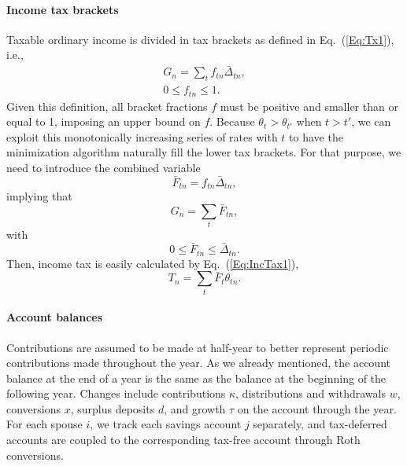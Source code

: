\documentclass{report}[fleqn,12pt]
\begin{document}
\paragraph*{Income tax brackets}
	Taxable ordinary income is divided in tax brackets as defined in Eq.~(\ref{Eq:Tx1}), i.e.,
	\begin{eqnarray}
		\label{Eq:C2}
		G_n = \sum_t f_{tn}\bar{\Delta}_{tn} ,\nonumber\\
		0 \leq f_{tn} \leq 1.
	\end{eqnarray}
	Given this definition, all bracket fractions $f$ must be positive and smaller than or equal to 1,
	imposing an upper bound on $f$.
	Because $\theta_{t} > \theta_{t'}$ when $t > t'$, we can exploit
	this monotonically increasing series of rates with $t$ to have the minimization
	algorithm naturally fill the lower tax brackets.
	For that purpose, we need to introduce the combined variable
	\begin{equation}
		\bar{F}_{tn} = f_{tn}\bar{\Delta}_{tn},
	\end{equation}
	implying that
	\begin{equation}
		G_n = \sum_t \bar{F}_{tn},
	\end{equation}
	with
	\begin{equation}
		0 \le \bar{F}_{tn} \le \bar{\Delta}_{tn}.
	\end{equation}
	Then, income tax is easily calculated by Eq.~(\ref{Eq:IncTax1}), 
	\begin{equation*}
		T_n = \sum_t \bar{F}_t \theta_{tn}.
	\end{equation*}

\paragraph*{Account balances}
	Contributions are assumed to be made at half-year to better represent periodic contributions
	made throughout the year. As we already mentioned,
	the account balance at the end of a year is the same as the balance
	at the beginning of the following year.
	Changes include contributions $\kappa$, distributions and withdrawals $w$,
	conversions $x$, surplus deposits $d$, and growth $\tau$ on the account through the year.
	For each spouse $i$, we track each savings account $j$ separately, and tax-deferred accounts
	are coupled to the corresponding tax-free account through Roth conversions.
\end{document}
